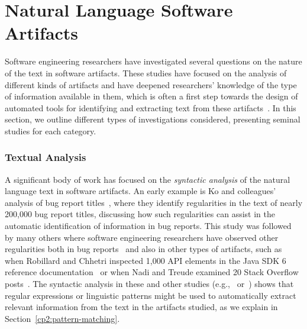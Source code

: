 \section{Natural Language Software Artifacts}
\label{cp2:text-in-se}








Software engineering researchers
have investigated several questions on the nature of the text in software artifacts.
These studies have focused on the analysis of different kinds of artifacts and have deepened researchers' knowledge of the type of information available in them,
 which is often a first step towards the design of automated tools 
for identifying and extracting text from these artifacts~\cite{Arya2019, Maalej2013}.
In this section, we outline 
different types of investigations considered,
presenting seminal studies for each category.



\subsubsection{Textual Analysis} 

A significant body of work has 
focused on the \textit{syntactic analysis} of the natural language text 
in software artifacts. An early example
is Ko and colleagues' analysis of bug report titles~\cite{Ko2006},
where they identify regularities in the text of nearly 200,000 bug report titles,
discussing how such regularities can 
assist in the automatic identification 
of information in bug reports. 
This study was followed by many others where 
software engineering researchers have 
observed other regularities both in bug reports~\cite{Rastkar2010, Chaparro2016}
and also in other types of artifacts, such as 
when Robillard  and Chhetri inspected 1,000 API elements in the Java SDK 6 
reference documentation~\cite{Maalej2013} or when 
Nadi and Treude examined 20 Stack Overflow posts~\cite{nadi2020}.
The syntactic analysis in these and other studies (e.g.,~\cite{chaparro2019} or~\cite{lin2019})
shows that regular expressions or 
linguistic patterns 
might be used to automatically extract 
relevant information from the text  
in the artifacts studied, as we explain in Section~\ref{cp2:pattern-matching}.

